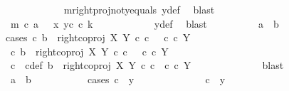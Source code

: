 \begin{isabellebody}
\ \ \ \ \ \ \ \ \ \ \isamarkupfalse%
\ m{\isacharunderscore}{\kern0pt}rightproj{\isacharunderscore}{\kern0pt}not{\isacharunderscore}{\kern0pt}y{}{\isacharunderscore}{\kern0pt}equals\ y{\isacharunderscore}{\kern0pt}def\ \isamarkupfalse%
\ blast\ \ \isanewline
\ \ \ \ \ \ \ \ \isamarkupfalse%
\ \isamarkupfalse%
\ {\isachardoublequoteopen}m\ {\isasymcirc}\isactrlsub c\ a\ \ {\isacharequal}{\kern0pt}\ {\isasymlangle}x{}{\isacharcomma}{\kern0pt}\ y{}\isactrlsup c\ {\isasymcirc}\isactrlsub c\ k{\isasymrangle}{\isachardoublequoteclose}\isanewline
\ \ \ \ \ \ \ \ \ \ \isamarkupfalse%
\ y{\isacharunderscore}{\kern0pt}def\ \isamarkupfalse%
\ blast\isanewline
\ \ \ \ \ \ \ \ \isamarkupfalse%
\ {\isachardoublequoteopen}a\ {\isacharequal}{\kern0pt}\ b{\isachardoublequoteclose}\isanewline
\ \ \ \ \ \ \ \ \isamarkupfalse%
{\isacharparenleft}{\kern0pt}cases\ {\isachardoublequoteopen}{\isasymexists}c{\isachardot}{\kern0pt}\ b\ {\isacharequal}{\kern0pt}\ right{\isacharunderscore}{\kern0pt}coproj\ X\ Y\ {\isasymcirc}\isactrlsub c\ c\ \ {\isasymand}\ c\ {\isasymin}\isactrlsub c\ Y{\isachardoublequoteclose}{\isacharparenright}{\kern0pt}\isanewline
\ \ \ \ \ \ \ \ \ \ \isamarkupfalse%
\ {\isachardoublequoteopen}{\isasymexists}c{\isachardot}{\kern0pt}\ b\ {\isacharequal}{\kern0pt}\ right{\isacharunderscore}{\kern0pt}coproj\ X\ Y\ {\isasymcirc}\isactrlsub c\ c\ \ {\isasymand}\ c\ {\isasymin}\isactrlsub c\ Y{\isachardoublequoteclose}\isanewline
\ \ \ \ \ \ \ \ \ \ \isamarkupfalse%
\ \isamarkupfalse%
\ c\ \ c{\isacharunderscore}{\kern0pt}def{\isacharcolon}{\kern0pt}\ {\isachardoublequoteopen}b\ {\isacharequal}{\kern0pt}\ right{\isacharunderscore}{\kern0pt}coproj\ X\ Y\ {\isasymcirc}\isactrlsub c\ c\ {\isasymand}\ c\ {\isasymin}\isactrlsub c\ Y{\isachardoublequoteclose}\isanewline
\ \ \ \ \ \ \ \ \ \ \ \ \isamarkupfalse%
\ blast\ \ \isanewline
\ \ \ \ \ \ \ \ \ \ \isamarkupfalse%
\ {\isachardoublequoteopen}a\ {\isacharequal}{\kern0pt}\ b{\isachardoublequoteclose}\isanewline
\ \ \ \ \ \ \ \ \ \ \isamarkupfalse%
{\isacharparenleft}{\kern0pt}cases\ {\isachardoublequoteopen}c\ {\isacharequal}{\kern0pt}\ y{}{\isachardoublequoteclose}{\isacharparenright}{\kern0pt}\isanewline
\ \ \ \ \ \ \ \ \ \ \ \ \isamarkupfalse%
\ {\isachardoublequoteopen}c\ {\isacharequal}{\kern0pt}\ y{}{\isachardoublequoteclose}\ \isanewline

\end{isabellebody}
